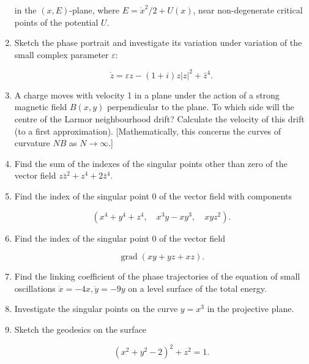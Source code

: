\documentclass{article}
\DeclareMathOperator{\gradt}{grad}
\begin{document}
\begin{enumerate}
  in the $(x, E)$-plane, where $E = \dot x^2/2 + U(x)$, near non-degenerate
  critical points of the potential $U$.

\item Sketch the phase portrait and investigate its variation under variation of
  the small complex parameter $\varepsilon$:

  \begin{equation*}
    \dot z = \varepsilon z - (1 + i) z \left| z \right|^2 + \bar{z}^4.
  \end{equation*}

\item A charge moves with velocity 1 in a plane under the action of a strong
  magnetic field $B(x, y)$ perpendicular to the plane. To which side will the
  centre of the Larmor neighbourhood drift? Calculate the velocity of this drift (to a first approximation). [Mathematically, this concerns the curves of curvature $NB$ as $N \rightarrow \infty$.]

\item Find the sum of the indexes of the singular points other than zero of the
  vector field $z\bar{z}^2 + z^4 + 2\bar{z}^4$.

\item Find the index of the singular point 0 of the vector field with components

  \begin{equation*}
    (x^4 + y^4 + z^4,\quad x^3y - xy^3,\quad xyz^2).
  \end{equation*}

\item Find the index of the singular point 0 of the vector field

  \begin{equation*}
    \gradt (xy + yz + xz).
  \end{equation*}

\item Find the linking coefficient of the phase trajectories of the equation of
  small oscillations $\ddot x = -4x, \ddot y = -9y$ on a level surface of the
  total energy.

\item Investigate the singular points on the curve $y = x^3$ in the projective plane.

\item Sketch the geodesics on the surface

  \begin{equation*}
    (x^2 + y^2 - 2)^2 + z^2 = 1 .
  \end{equation*}


\end{enumerate}
\end{document}

